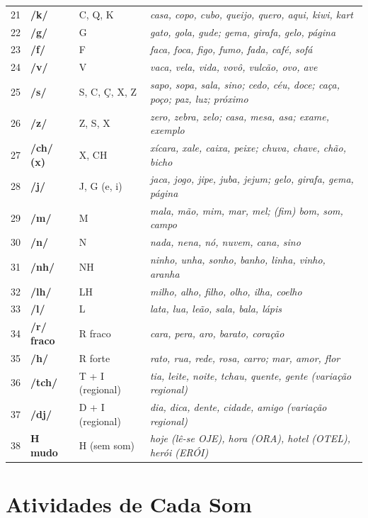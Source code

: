 \begin{center}
\begin{tabular}{@{}cp{2.6cm}p{5.2cm}p{5.2cm}@{}}
21 & \textbf{/k/} & C, Q, K & \textit{casa, copo, cubo, queijo, quero, aqui, kiwi, kart} \\
22 & \textbf{/g/} & G & \textit{gato, gola, gude; gema, girafa, gelo, página} \\
23 & \textbf{/f/} & F & \textit{faca, foca, figo, fumo, fada, café, sofá} \\
24 & \textbf{/v/} & V & \textit{vaca, vela, vida, vovô, vulcão, ovo, ave} \\
25 & \textbf{/s/} & S, C, Ç, X, Z & \textit{sapo, sopa, sala, sino; cedo, céu, doce; caça, poço; paz, luz; próximo} \\
26 & \textbf{/z/} & Z, S, X & \textit{zero, zebra, zelo; casa, mesa, asa; exame, exemplo} \\
27 & \textbf{/ch/ (x)} & X, CH & \textit{xícara, xale, caixa, peixe; chuva, chave, chão, bicho} \\
28 & \textbf{/j/} & J, G (e, i) & \textit{jaca, jogo, jipe, juba, jejum; gelo, girafa, gema, página} \\
29 & \textbf{/m/} & M & \textit{mala, mão, mim, mar, mel; (fim) bom, som, campo} \\
30 & \textbf{/n/} & N & \textit{nada, nena, nó, nuvem, cana, sino} \\
31 & \textbf{/nh/} & NH & \textit{ninho, unha, sonho, banho, linha, vinho, aranha} \\
32 & \textbf{/lh/} & LH & \textit{milho, alho, filho, olho, ilha, coelho} \\
33 & \textbf{/l/} & L & \textit{lata, lua, leão, sala, bala, lápis} \\
34 & \textbf{/r/ fraco} & R fraco & \textit{cara, pera, aro, barato, coração} \\
35 & \textbf{/h/} & R forte & \textit{rato, rua, rede, rosa, carro; mar, amor, flor} \\
36 & \textbf{/tch/} & T + I (regional) & \textit{tia, leite, noite, tchau, quente, gente (variação regional)} \\
37 & \textbf{/dj/} & D + I (regional) & \textit{dia, dica, dente, cidade, amigo (variação regional)} \\
38 & \textbf{H mudo} & H (sem som) & \textit{hoje (lê-se OJE), hora (ORA), hotel (OTEL), herói (ERÓI)} \\
\hline
\end{tabular}
\end{center}

\section{Atividades de Cada Som}

